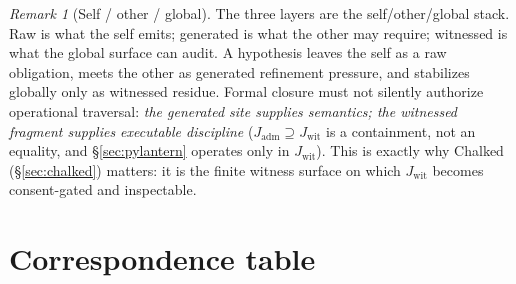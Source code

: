 \documentclass[11pt]{article}
\theoremstyle{definition}
\theoremstyle{remark}
\newtheorem*{remark}{Remark}
\newcommand{\Jadm}{J_{\mathrm{adm}}}
\newcommand{\Jwit}{J_{\mathrm{wit}}}
\begin{document}
\begin{remark}[Self / other / global]
The three layers are the self/other/global stack. Raw is what the self emits; generated is what the
other may require; witnessed is what the global surface can audit. A hypothesis leaves the self as a
raw obligation, meets the other as generated refinement pressure, and stabilizes globally only as
witnessed residue. Formal closure must not silently authorize operational traversal: \emph{the
generated site supplies semantics; the witnessed fragment supplies executable discipline}
($\Jadm\supseteq\Jwit$ is a containment, not an equality, and \S\ref{sec:pylantern} operates only in
$\Jwit$). This is exactly why Chalked (\S\ref{sec:chalked}) matters: it is the finite witness surface
on which $\Jwit$ becomes consent-gated and inspectable.
\end{remark}

\section{Correspondence table}
\end{document}
